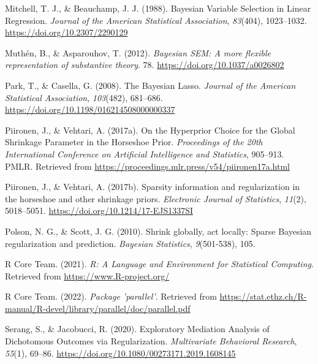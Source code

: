 \documentclass[
  man, donotrepeattitle,floatsintext]{apa6}
\newlength{\cslhangindent}
\newlength{\cslentryspacingunit} %
\newenvironment{CSLReferences}[2] %
 {%
  \setlength{\parindent}{0pt}
  \ifodd #1
  \let\oldpar\par
  \def\par{\hangindent=\cslhangindent\oldpar}
  \fi
  \setlength{\parskip}{#2\cslentryspacingunit}
 }%
 {}
\begin{document}
\begin{CSLReferences}{1}{0}
\leavevmode{}%
Mitchell, T. J., \& Beauchamp, J. J. (1988). Bayesian {Variable} {Selection} in {Linear} {Regression}. \emph{Journal of the American Statistical Association}, \emph{83}(404), 1023--1032. \url{https://doi.org/10.2307/2290129}

\leavevmode{}%
Muthén, B., \& Asparouhov, T. (2012). \emph{Bayesian {SEM}: {A} more ﬂexible representation of substantive theory}. 78. \url{https://doi.org/10.1037/a0026802}

\leavevmode{}%
Park, T., \& Casella, G. (2008). The {Bayesian} {Lasso}. \emph{Journal of the American Statistical Association}, \emph{103}(482), 681--686. \url{https://doi.org/10.1198/016214508000000337}

\leavevmode{}%
Piironen, J., \& Vehtari, A. (2017a). On the {Hyperprior} {Choice} for the {Global} {Shrinkage} {Parameter} in the {Horseshoe} {Prior}. \emph{Proceedings of the 20th {International} {Conference} on {Artificial} {Intelligence} and {Statistics}}, 905--913. PMLR. Retrieved from \url{https://proceedings.mlr.press/v54/piironen17a.html}

\leavevmode{}%
Piironen, J., \& Vehtari, A. (2017b). Sparsity information and regularization in the horseshoe and other shrinkage priors. \emph{Electronic Journal of Statistics}, \emph{11}(2), 5018--5051. \url{https://doi.org/10.1214/17-EJS1337SI}

\leavevmode{}%
Polson, N. G., \& Scott, J. G. (2010). Shrink globally, act locally: {Sparse} {Bayesian} regularization and prediction. \emph{Bayesian Statistics}, \emph{9}(501-538), 105.

\leavevmode{}%
R Core Team. (2021). \emph{R: {A} {Language} and {Environment} for {Statistical} {Computing}}. Retrieved from \url{https://www.R-project.org/}

\leavevmode{}%
R Core Team. (2022). \emph{Package 'parallel'}. Retrieved from \url{https://stat.ethz.ch/R-manual/R-devel/library/parallel/doc/parallel.pdf}

\leavevmode{}%
Serang, S., \& Jacobucci, R. (2020). Exploratory {Mediation} {Analysis} of {Dichotomous} {Outcomes} via {Regularization}. \emph{Multivariate Behavioral Research}, \emph{55}(1), 69--86. \url{https://doi.org/10.1080/00273171.2019.1608145}


\end{CSLReferences}
\end{document}
